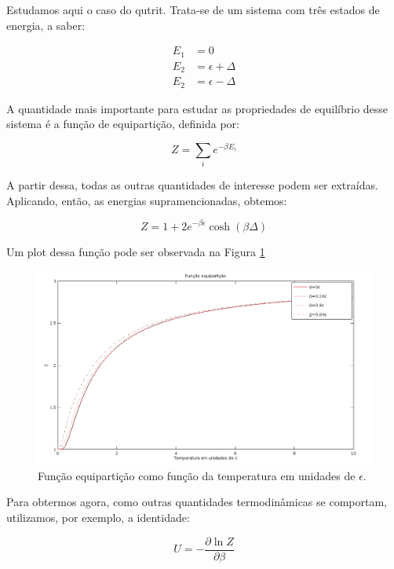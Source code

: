 Estudamos aqui o caso do qutrit. Trata-se de um sistema com três estados de energia, a saber:

\begin{equation}
\begin{split}
E_1 & =0 \\
E_2 & =\epsilon+\Delta \\
E_2 & =\epsilon-\Delta
\end{split}
\end{equation}

A quantidade mais importante para estudar as propriedades de equilíbrio desse sistema é 
a função de equipartição, definida por:

\begin{equation}
Z=\sum_i e^{-\beta E_i}
\end{equation}

A partir dessa, todas as outras quantidades de interesse podem ser extraídas. Aplicando, então, as energias supramencionadas, obtemos:

\begin{equation}
Z=1+2e^{-\beta \epsilon}\cosh(\beta \Delta)
\end{equation}

Um plot dessa função pode ser observada na Figura \ref{Z}

\begin{figure}
\includegraphics[scale=.3]{Z.png}
\caption{Função equipartição como função da temperatura em unidades de $\epsilon$.}
\label{Z}
\end{figure}

Para obtermos agora, como outras quantidades termodinâmicas se comportam, utilizamos, por exemplo, a identidade:

\begin{equation}
U=-\frac{\partial \ln Z}{\partial \beta}
\end{equation}

